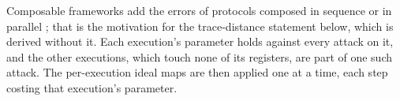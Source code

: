 
Composable frameworks add the errors of protocols composed in sequence or
in parallel \cite[Sec.~II.E]{portmann2022security}; that is the motivation
for the trace-distance statement below, which is derived without it. Each
execution's parameter holds against every attack on it, and the other
executions, which touch none of its registers, are part of one such
attack. The per-execution ideal maps are then applied one at a time, each
step costing that execution's parameter.

